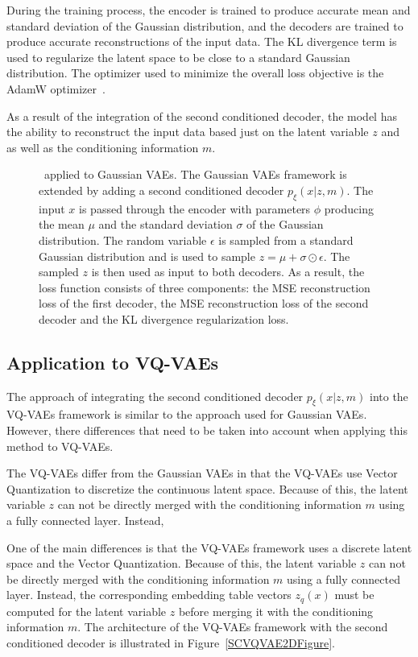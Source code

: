 During the training process, the encoder is trained to produce accurate mean
and standard deviation of the Gaussian distribution, and the decoders are
trained to produce accurate reconstructions of the input data. The KL
divergence term is used to regularize the latent space to be close to a
standard Gaussian distribution. The optimizer used to minimize the overall loss
objective is the AdamW optimizer~\cite{AdamW}.

As a result of the integration of the second conditioned decoder, the model has
the ability to reconstruct the input data based just on the latent variable $z$
and as well as the conditioning information $m$.
\begin{figure}[H]
    \centering
    
    \caption[ applied to Gaussian VAEs.]%
    {
        \methodOne\ applied to Gaussian VAEs. The Gaussian VAEs framework is extended by adding a second conditioned decoder $p_\xi(x|z,m)$. The input $x$ is passed through the encoder with parameters $\phi$ producing the mean $\mu$ and the standard deviation $\sigma$ of the Gaussian distribution. The random variable $\epsilon$ is sampled from a standard Gaussian distribution and is used to sample $ z = \mu + \sigma \odot \epsilon$. The sampled $z$ is then used as input to both decoders. As a result, the loss function consists of three components: the MSE reconstruction loss of the first decoder, the MSE reconstruction loss of the second decoder and the KL divergence regularization loss.
    }\label{SCVAE2DFigure}
\end{figure}

\subsection{Application to VQ-VAEs}

The approach of integrating the second conditioned decoder $p_\xi(x|z,m)$ into
the VQ-VAEs framework is similar to the approach used for Gaussian VAEs.
However, there differences that need to be taken into account when applying
this method to VQ-VAEs.

The VQ-VAEs differ from the Gaussian VAEs in that the VQ-VAEs use Vector
Quantization to discretize the continuous latent space. Because of this, the
latent variable $z$ can not be directly merged with the conditioning
information $m$ using a fully connected layer. Instead,

One of the main differences is that the VQ-VAEs framework uses a discrete
latent space and the Vector Quantization. Because of this, the latent variable
$z$ can not be directly merged with the conditioning information $m$ using a
fully connected layer. Instead, the corresponding embedding table vectors
$z_q(x)$ must be computed for the latent variable $z$ before merging it with
the conditioning information $m$. The architecture of the VQ-VAEs framework
with the second conditioned decoder is illustrated in
Figure~\ref{SCVQVAE2DFigure}.

